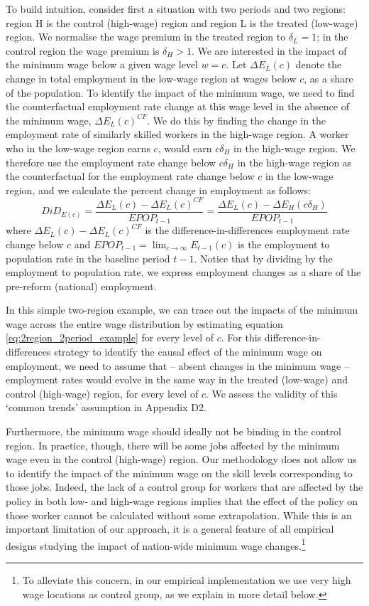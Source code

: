 To build intuition, consider first a situation with two periods and two regions: region H is the control (high-wage) region and region L is the treated (low-wage) region. We normalise the wage premium in the treated region to $\delta_{L}=1$; in the control region the wage premium is $\delta_{H}>1$. We are interested in the impact of the minimum wage below a given wage level $w=c$. Let $\Delta E_{L}(c)$ denote the change in total employment in the low-wage region at wages below $c$, as a share of the population. To identify the impact of the minimum wage, we need to find the counterfactual employment rate change at this wage level in the absence of the minimum wage, $\Delta E_{L}(c)^{CF}$. We do this by finding the change in the employment rate of similarly skilled workers in the high-wage region. A worker who in the low-wage region earns $c$, would earn $c\delta_{H}$ in the high-wage region. We therefore use the employment rate change below $c\delta_{H}$ in the high-wage region as the counterfactual for the employment rate change below $c$ in the low-wage region, and we calculate the percent change in employment as follows:
\begin{equation} \label{eq:2region_2period_example}
    DiD_{E(c)} = \frac{ \Delta E_{L}(c) - \Delta E_{L}(c)^{CF} }{EPOP_{t-1}}= \frac{
    \Delta E_{L}(c) - \Delta E_{H}(c\delta_{H})}{EPOP_{t-1}}
\end{equation}
where $\Delta E_{L}(c) - \Delta E_{L}(c)^{CF} $ is the difference-in-differences employment rate change below $c$ and $EPOP_{t-1}=\lim_{c\to\infty} E_{t-1}(c)$ is the employment to population rate in the baseline period $t-1$. Notice that by dividing by the employment to population rate, we express employment changes as a share of the pre-reform (national) employment. 

In this simple two-region example, we can trace out the impacts of the minimum wage across the entire wage distribution by estimating equation \ref{eq:2region_2period_example} for every level of $c$. For this difference-in-differences strategy to identify the causal effect of the minimum wage on employment, we need to assume that -- absent changes in the minimum wage -- employment rates would evolve in the same way in the treated (low-wage) and control (high-wage) region, for every level of $c$. We assess the validity of this `common trends' assumption in Appendix D2. 

Furthermore, the minimum wage should ideally not be binding in the control region. In practice, though, there will be some jobs affected by the minimum wage even in the control (high-wage) region. Our methodology does not allow us to identify the impact of the minimum wage on the skill levels corresponding to those jobs. Indeed, the lack of a control group for workers that are affected by the policy in both low- and high-wage regions implies that the effect of the policy on those worker cannot be calculated without some extrapolation. While this is an important limitation of our approach, it is a general feature of all empirical designs studying the impact of nation-wide minimum wage changes.\footnote{To alleviate this concern, in our empirical implementation we use very high wage locations as control group, as we explain in more detail below.}

